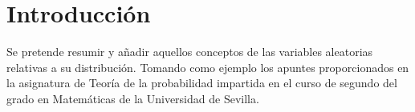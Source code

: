 \chapter*{Introducción}

Se pretende resumir y añadir aquellos conceptos de las variables
aleatorias relativas a su distribución. Tomando como ejemplo
los apuntes proporcionados en la asignatura de Teoría de la probabilidad
impartida en el curso de segundo del grado en Matemáticas de la
Universidad de Sevilla.